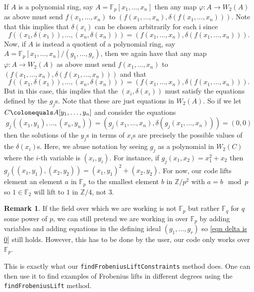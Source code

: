 \documentclass{article}
\theoremstyle{plain}
\theoremstyle{definition}
\newtheorem{remark}[theorem]{Remark}
\newcommand{\comment}[1]{ 
	\begin{center}
		\fcolorbox{red}{white}{
		\begin{minipage}{0.95\textwidth}
			{\color{red} #1}
		\end{minipage}}
	\end{center}}
\newcommand{\Z}{\mathbb{Z}}
\newcommand{\F}{\mathbb{F}}
\newcommand{\coloneqq}{\colonequals}
\renewcommand{\phi}{\varphi}
\renewcommand{\to}{\longrightarrow}
\begin{document}
If $A$ is a polynomial ring, say $A=\F_p[x_1,\ldots, x_n]$ then any map $\phi\colon A\to W_2(A)$ as above must send $f(x_1,\ldots, x_n)$ to $(f(x_1,\ldots, x_n),\delta(f(x_1,\ldots, x_n)))$. Note that this implies that $\delta(x_i)$ can be chosen arbitrarily for each i since 
\[
f((x_1,\delta(x_1)),\ldots, (x_n,\delta(x_n)))= (f(x_1,\ldots, x_n),\delta(f(x_1,\ldots, x_n))).
\]
Now, if $A$ is instead a quotient of a polynomial ring, say $A=\F_p[x_1,\ldots,x_n]/(g_1,\ldots, g_r)$, then we again have that any map $\phi\colon A\to W_2(A)$ as above must send $f(x_1,\ldots, x_n)$ to $(f(x_1,\ldots, x_n),\delta(f(x_1,\ldots, x_n)))$ and that 
\[
f((x_1,\delta(x_1)),\ldots, (x_n,\delta(x_n)))= (f(x_1,\ldots, x_n),\delta(f(x_1,\ldots, x_n))).
\]
But in this case, this implies that the $(x_i,\delta(x_i))$ must satisfy the equations defined by the $g_j$s. Note that these are just equations in $W_2(A)$. So if we let $C\coloneqq A[y_1,\ldots,y_n]$ and consider the equations 
\begin{equation}\label{eqn delta is 0}
g_j((x_1,y_1),\ldots, (x_n,y_n))= (g_j(x_1,\ldots, x_n),\delta(g_j(x_1,\ldots, x_n)))=(0,0)
\end{equation}
then the solutions of the $y_j$s in terms of $x_i$s are precisely the possible values of the $\delta(x_i)$s. Here, we abuse notation by seeing $g_j$ as a polynomial in $W_2(C)$ where the $i$-th variable is $(x_i,y_i)$. For instance, if $g_j(x_1,x_2)=x_1^2+x_2$ then $g_j((x_1,y_1),(x_2,y_2))=(x_1,y_1)^2+(x_2,y_2)$. For now, our code lifts element an element $a$ in $\F_p$ to the smallest element $b$ in $\Z/p^2$ with $a=b\mod p$ so $1\in \F_2$ will lift to $1$ in $ \Z/4$, not $3$.


\begin{remark}
If the field over which we are working is not $\F_p$ but rather $\F_q$ for $q$ some power of $p$, we can still pretend we are working in over $\F_p$ by adding variables and adding equations in the defining ideal $(g_1,\ldots,g_r)$ so \autoref{eqn delta is 0} still holds. However, this has to be done by the user, our code only works over $\F_p$. 
\comment{I think we can change this.}
\end{remark}


This is exactly what our \texttt{findFrobeniusLiftConstraints} method does. One can then use it to find examples of Frobenius lifts in different degrees using the \texttt{findFrobeniusLift} method. 
\end{document}
